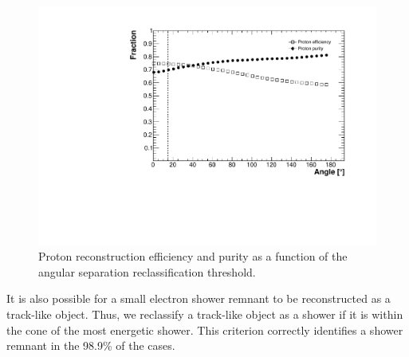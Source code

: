\begin{figure}[htbp]
\centering
  \includegraphics[width=0.65\linewidth]{figures/proton_angle.pdf}
  \caption{Proton reconstruction efficiency and purity as a function of the angular separation reclassification threshold.}
  \label{fig:showerangle}
\end{figure}

It is also possible for a small electron shower remnant to be reconstructed as a track-like object. Thus, we reclassify a track-like object as a shower if it is within the cone of the most energetic shower. This criterion correctly identifies a shower remnant in the 98.9\% of the cases.


